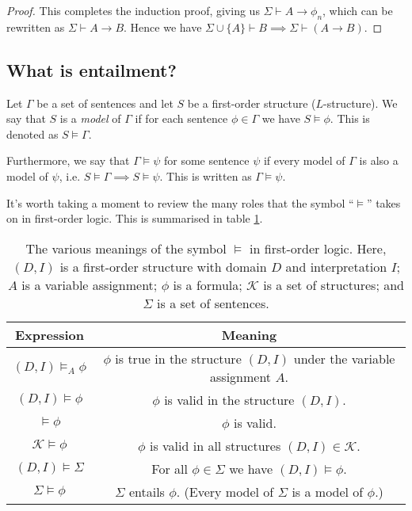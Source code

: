 \begin{proof}
    This completes the induction proof, giving us \(\Sigma\vdash A\rightarrow\phi_n\), which can be rewritten as \(\Sigma\vdash A \rightarrow B\). Hence we have \(\Sigma\cup\{A\}\vdash B \implies \Sigma\vdash(A\rightarrow B)\).
\end{proof}



\subsection{What is entailment?}

Let \(\Gamma\) be a set of sentences and let \(S\) be a first-order structure (\(L\)-structure). We say that \(S\) is a \emph{model} of \(\Gamma\) if for each sentence \(\phi\in\Gamma\) we have \(S\models\phi\). This is denoted as \(S\models\Gamma\).

Furthermore, we say that \(\Gamma\models\psi\) for some sentence \(\psi\) if every model of \(\Gamma\) is also a model of \(\psi\), i.e. \(S\models\Gamma\implies S\models\psi\). This is written as \(\Gamma\models\psi\).

It's worth taking a moment to review the many roles that the symbol ``\(\models\)'' takes on in first-order logic. This is summarised in table \ref{tab:Ch07-models-meaning}.
%
\begin{table}[H]
    \centering
    \begin{tabular}{|c|c|}
        \hline
        \textbf{Expression} & \textbf{Meaning}\\
        \hline
        \((D,I) \models_A \phi\) & \(\phi\) is true in the structure \((D, I)\) under the variable assignment \(A\).\\
        \hline
        \((D,I) \models \phi\) & \(\phi\) is valid in the structure \((D, I)\).\\
        \hline
        \(\models \phi\) & \(\phi\) is valid.\\
        \hline
        \(\mathcal{K}\models\phi\) & \(\phi\) is valid in all structures \((D, I) \in \mathcal{K}\).\\
        \hline
        \((D, I) \models\Sigma\) & For all \(\phi\in\Sigma\) we have \((D, I)\models\phi\).\\
        \hline
        \(\Sigma\models\phi\) & \(\Sigma\) entails \(\phi\). (Every model of \(\Sigma\) is a model of \(\phi\).)\\
        \hline
    \end{tabular}
    \caption{The various meanings of the symbol \(\models\) in first-order logic. Here, \((D, I)\) is a first-order structure with domain \(D\) and interpretation \(I\); \(A\) is a variable assignment; \(\phi\) is a formula; \(\mathcal{K}\) is a set of structures; and \(\Sigma\) is a set of sentences.}
    \label{tab:Ch07-models-meaning}
\end{table}

